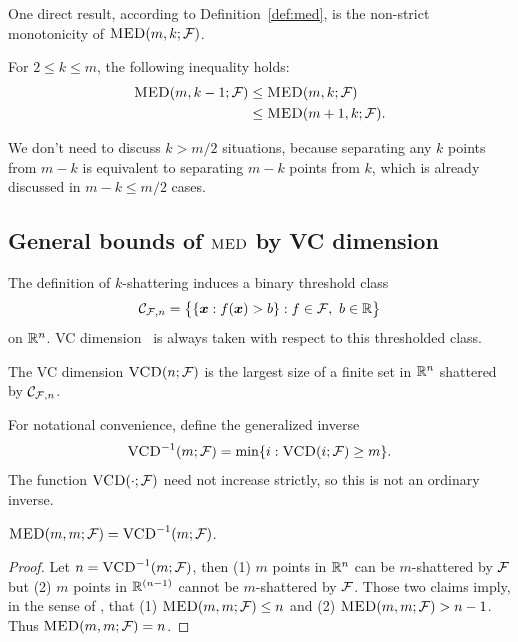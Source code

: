 \documentclass{article}
\begin{document}
One direct result, according to Definition~\ref{def:med}, is the non-strict monotonicity of $\textsc{MED}(m, k; \mathcal{F})$.
\begin{proposition}\label{prop:monotonic}
For $2\leq k\leq m$, the following inequality holds:
\begin{align*}
    \textsc{MED}(m, k-1;\mathcal{F})
    &\leq \textsc{MED}(m, k; \mathcal{F}) \\
    &\leq \textsc{MED}(m+1, k; \mathcal{F}).
\end{align*}
\end{proposition}

We don't need to discuss $k > m/2$ situations, because separating any $k$ points from $m-k$ is equivalent to separating $m-k$ points from $k$, which is already discussed in $m-k \leq m/2$ cases.

\subsection{General bounds of $\textsc{MED}$ by VC dimension}

The definition of $k$-shattering induces a binary threshold class
\[
    \mathcal{C}_{\functionals,n}
    =
    \bigl\{\{\vx:f(\vx)>b\}: f\in\functionals,\ b\in\real\bigr\}
\]
on $\mathbb{R}^n$. VC dimension~\citep{mohri2018foundations} is always taken with respect to this thresholded class.
\begin{definition}[VC dimension]
    The VC dimension $\textsc{VCD}(n;\mathcal{F})$ is the largest size of a finite set in $\mathbb{R}^n$ shattered by $\mathcal{C}_{\mathcal{F},n}$.
\end{definition}
For notational convenience, define the generalized inverse
\[
    \textsc{VCD}^{-1}(m;\mathcal{F})=\min \{i : \textsc{VCD}(i;\mathcal{F})\ge m\}.
\]
The function $\textsc{VCD}(\cdot ;\mathcal{F})$ need not increase strictly, so this is not an ordinary inverse.
\begin{lemma}\label{lemma:connection-VCD}
    $\textsc{MED}(m, m;\mathcal{F}) = \textsc{VCD}^{-1}(m;\mathcal{F})$.
\end{lemma}

\begin{proof}
    Let $n = \textsc{VCD}^{-1}(m; \mathcal{F})$, then (1) $m$ points in $\mathbb{R}^n$ can be $m$-shattered by $\mathcal{F}$ but (2) $m$ points in $\mathbb{R}^{(n-1)}$ cannot be $m$-shattered by $\mathcal{F}$. Those two claims imply, in the sense of \med, that (1) $\textsc{MED}(m, m; \mathcal{F}) \leq n$ and (2) $\textsc{MED}(m, m; \mathcal{F}) > n - 1$. Thus $\textsc{MED}(m, m; \mathcal{F}) = n$.
\end{proof}
\end{document}
